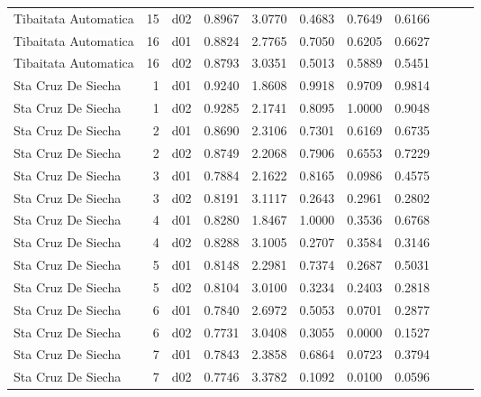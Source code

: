 \begin{landscape}
\begin{longtable}{p{2cm}rrrrrrrrrr}
    Tibaitata Automatica  &         15 &     d02 &   0.8967 &  3.0770 &        0.4683 &           0.7649 &  0.6166 \\
    Tibaitata Automatica  &         16 &     d01 &   0.8824 &  2.7765 &        0.7050 &           0.6205 &  0.6627 \\
    Tibaitata Automatica  &         16 &     d02 &   0.8793 &  3.0351 &        0.5013 &           0.5889 &  0.5451 \\
      Sta Cruz De Siecha  &          1 &     d01 &   0.9240 &  1.8608 &        0.9918 &           0.9709 &  0.9814 \\
      Sta Cruz De Siecha  &          1 &     d02 &   0.9285 &  2.1741 &        0.8095 &           1.0000 &  0.9048 \\
      Sta Cruz De Siecha  &          2 &     d01 &   0.8690 &  2.3106 &        0.7301 &           0.6169 &  0.6735 \\
      Sta Cruz De Siecha  &          2 &     d02 &   0.8749 &  2.2068 &        0.7906 &           0.6553 &  0.7229 \\
      Sta Cruz De Siecha  &          3 &     d01 &   0.7884 &  2.1622 &        0.8165 &           0.0986 &  0.4575 \\
      Sta Cruz De Siecha  &          3 &     d02 &   0.8191 &  3.1117 &        0.2643 &           0.2961 &  0.2802 \\
      Sta Cruz De Siecha  &          4 &     d01 &   0.8280 &  1.8467 &        1.0000 &           0.3536 &  0.6768 \\
      Sta Cruz De Siecha  &          4 &     d02 &   0.8288 &  3.1005 &        0.2707 &           0.3584 &  0.3146 \\
      Sta Cruz De Siecha  &          5 &     d01 &   0.8148 &  2.2981 &        0.7374 &           0.2687 &  0.5031 \\
      Sta Cruz De Siecha  &          5 &     d02 &   0.8104 &  3.0100 &        0.3234 &           0.2403 &  0.2818 \\
      Sta Cruz De Siecha  &          6 &     d01 &   0.7840 &  2.6972 &        0.5053 &           0.0701 &  0.2877 \\
      Sta Cruz De Siecha  &          6 &     d02 &   0.7731 &  3.0408 &        0.3055 &           0.0000 &  0.1527 \\
      Sta Cruz De Siecha  &          7 &     d01 &   0.7843 &  2.3858 &        0.6864 &           0.0723 &  0.3794 \\
      Sta Cruz De Siecha  &          7 &     d02 &   0.7746 &  3.3782 &        0.1092 &           0.0100 &  0.0596 \\

\end{longtable}
\end{landscape}
